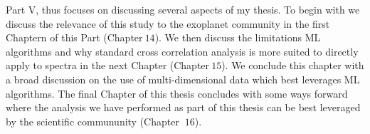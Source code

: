 Part V, thus focuses on discussing several aspects of my thesis. 
To begin with we discuss the relevance of this study to the exoplanet community in the first Chaptern of this Part (Chapter$~14$).
We then discuss the limitations ML algorithms and why standard cross correlation analysis is more suited to directly apply to spectra in the next Chapter (Chapter$~15$).
We conclude this chapter with a broad discussion on the use of multi-dimensional data which best leverages ML algorithms.
The final Chapter of this thesis concludes with some ways forward where the analysis we have performed as part of this thesis can be best leveraged by the scientific commununity (Chapter $~16$).  



